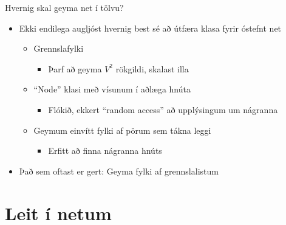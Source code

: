 \documentclass{beamer}
\begin{document}
\begin{frame}{Hvernig skal geyma net í tölvu?}
	\begin{itemize}
		\item Ekki endilega augljóst hvernig best sé að útfæra klasa fyrir óstefnt net
		      \begin{itemize}
			      \item Grennslafylki
			            \begin{itemize}
				            \item Þarf að geyma $V^2$ rökgildi, skalast illa
			            \end{itemize}
			      \item ``Node'' klasi með vísunum í aðlæga hnúta
			            \begin{itemize}
				            \item Flókið, ekkert ``random access'' að upplýsingum um nágranna
			            \end{itemize}
			      \item Geymum einvítt fylki af pörum sem tákna leggi
			            \begin{itemize}
				            \item Erfitt að finna nágranna hnúts
			            \end{itemize}
		      \end{itemize}
		\item Það sem oftast er gert: Geyma fylki af grennslalistum 
	\end{itemize}
\end{frame}





\section{Leit í netum}





\end{document}
